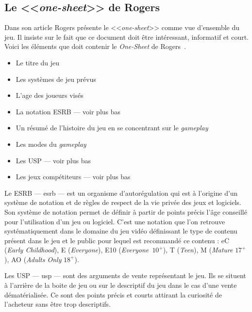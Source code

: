 \subsection{Le <<\emph{one-sheet}>> de Rogers \cite{LevelUpRogers2014}}

Dans son article Rogers présente le <<\emph{one-sheet}>> comme vue d'ensemble du jeu. Il insiste sur le fait que ce document doit être intéressant, informatif et court.
Voici les éléments que doit contenir le \emph{One-Sheet} de Rogers~\cite{LevelUpRogers2014}.
\begin{itemize}
    \item Le titre du jeu
    \item Les systèmes de jeu prévus
    \item L'age des joueurs visés
    \item La notation ESRB --- voir plus bas
    \item Un résumé de l'histoire du jeu en se concentrant sur le \emph{gameplay}
    \item Les modes du \emph{gameplay}
    \item Les USP --- voir plus bas
    \item Les jeux compétiteurs --- voir plus bas
\end{itemize}


Le ESRB --- \gls{esrb} --- est un organisme d'autorégulation qui est à l'origine d'un système de notation et de règles de respect de la vie privée des jeux et logiciels.
Son système de notation permet de définir à partir de points précis l'âge conseillé pour l'utilisation d'un jeu ou logiciel.
C'est une notation que l'on retrouve systématiquement dans le domaine du jeu vidéo définissant le type de contenu présent dans le jeu et le public pour lequel est recommandé ce contenu : eC (\emph{Early Childhood}), E (\emph{Everyone}), E10 (\emph{Everyone~$10^+$}), T (\emph{Teen}), M (\emph{Mature} $17^+$), AO (\emph{Adults Only} $18^+$).



Les USP --- \gls{usp} --- sont des arguments de vente représentant le jeu.
Ils se situent à l'arrière de la boite de jeu ou sur le descriptif du jeu dans le cas d'une vente dématérialisée.
Ce sont des points précis et courts attirant la curiosité de l'acheteur sans être trop descriptifs. 


